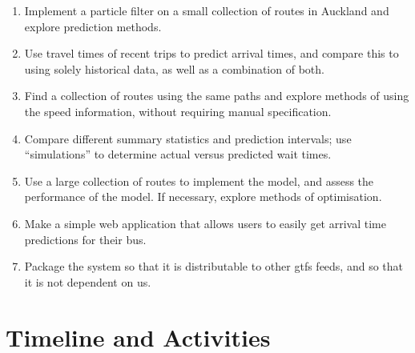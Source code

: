 \documentclass[12pt,a4paper]{article}
\newcommand{\pf}{particle filter}
\begin{document}
\begin{enumerate}
\item
  Implement a \pf{} on a small collection of routes in Auckland and explore prediction methods.

\item
  Use travel times of recent trips to predict arrival times,
  and compare this to using solely historical data, as well as a combination of both.

\item 
  Find a collection of routes using the same paths and explore methods of using the speed information,
  without requiring manual specification.

\item
  Compare different summary statistics and prediction intervals;
  use ``simulations'' to determine actual versus predicted wait times.

\item
  Use a large collection of routes to implement the model, and assess the performance of the model. 
  If necessary, explore methods of optimisation.

\item
  Make a simple web application that allows users to easily get arrival time predictions for their bus.
  
\item
  Package the system so that it is distributable to other \gls{gtfs} feeds,
  and so that it is not dependent on us.

\end{enumerate}






\section{Timeline and Activities}
\label{sec:timeline}

\end{document}
